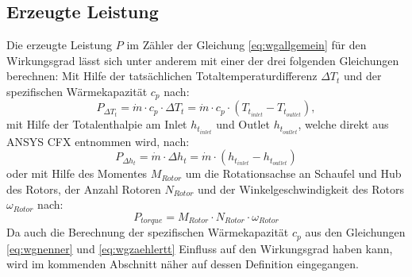 \subsection{Erzeugte Leistung}
\label{sec:wirkungsgrade}
Die erzeugte Leistung $P$ im Zähler der Gleichung \ref{eq:wgallgemein} für den Wirkungsgrad  lässt sich unter anderem mit einer der drei folgenden Gleichungen berechnen:\newline
Mit Hilfe der tatsächlichen Totaltemperaturdifferenz $\Delta T_t$ und der spezifischen Wärmekapazität $c_p$ nach:
\begin{equation}
\label{eq:wgzaehlertt}
P_{\Delta T_t} = \dot m \cdot c_p \cdot \Delta T_t = \dot m \cdot c_p \cdot \left( T_{t_{inlet}}-T_{t_{outlet}} \right),
\end{equation}
mit Hilfe der Totalenthalpie am Inlet $h_{t_{inlet}}$ und Outlet $h_{t_{outlet}}$, welche direkt aus ANSYS CFX entnommen wird, nach:
\begin{equation}
\label{eq:wgzaehlerht}
P_{\Delta h_t} = \dot m \cdot \Delta h_t = \dot m \cdot \left( h_{t_{inlet}}-h_{t_{outlet}} \right)
\end{equation}
oder mit Hilfe des Momentes $M_{Rotor}$ um die Rotationsachse an Schaufel und Hub des Rotors, der Anzahl Rotoren $N_{Rotor}$ und der Winkelgeschwindigkeit des Rotors $\omega_{Rotor}$ nach:
\begin{equation}
\label{eq:wgzaehlertorque}
P_{torque} = M_{Rotor} \cdot N_{Rotor} \cdot \omega_{Rotor}
\end{equation}
Da auch die Berechnung der spezifischen Wärmekapazität $c_p$ aus den Gleichungen \ref{eq:wgnenner} und \ref{eq:wgzaehlertt} Einfluss auf den Wirkungsgrad haben kann, wird im kommenden Abschnitt näher auf dessen Definition eingegangen.

